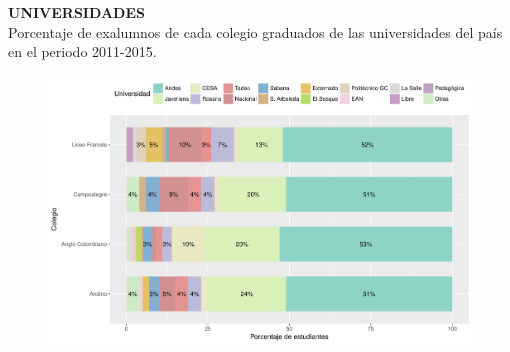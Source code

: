 \documentclass[letterpaper, 12pt]{book}\usepackage[]{graphicx}\usepackage[]{color}
\newenvironment{knitrout}{}{} %
\begin{document}
\newpage
\begin{center}
{\bf\Huge{UNIVERSIDADES}}\\
\vspace{0.1cm}
 Porcentaje de exalumnos de cada colegio graduados de las universidades del país en el periodo 2011-2015.
\end{center}
\vspace{2cm}
\begin{center}
\begin{knitrout}
\color{fgcolor}\begin{figure}[H]
\includegraphics[width=.9\linewidth]{figure/graphuniv-1} \caption[ ]{ }\label{fig:graphuniv}
\end{figure}


\end{knitrout}
\end{center}
\end{document}
